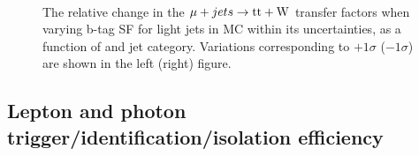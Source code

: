 \begin{figure}[!h]
  \centering
   ~~
  \\

  \caption{\label{fig:tfSyst_bsfl_muToTtw} The relative change in the $\mj \rightarrow \mathrm{tt+W}$ transfer
  factors when varying b-tag SF for light jets in MC within its uncertainties, as a function of \scalht and jet category. 
  Variations corresponding to $+1\sigma$ ($-1\sigma$) are shown in the left (right) figure. 
  }
\end{figure}

\clearpage
\subsection{Lepton and photon trigger/identification/isolation efficiency}


